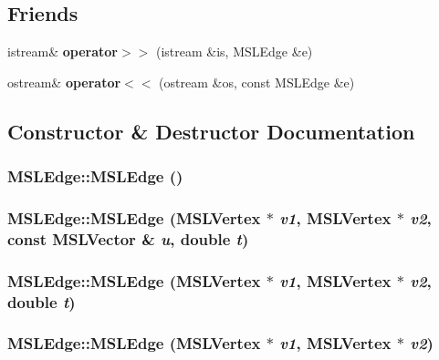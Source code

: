 \subsection*{Friends}
\begin{CompactItemize}
\item 
istream\& {\bf operator$>$$>$} (istream \&is, MSLEdge \&e)
\item 
ostream\& {\bf operator$<$$<$} (ostream \&os, const MSLEdge \&e)
\end{CompactItemize}


\subsection{Constructor \& Destructor Documentation}
\subsubsection{\setlength{\rightskip}{0pt plus 5cm}MSLEdge::MSLEdge ()}\label{class_MSLEdge_a0}


\subsubsection{\setlength{\rightskip}{0pt plus 5cm}MSLEdge::MSLEdge ({\bf MSLVertex} $\ast$ {\em v1}, {\bf MSLVertex} $\ast$ {\em v2}, const {\bf MSLVector} \& {\em u}, double {\em t})}\label{class_MSLEdge_a1}


\subsubsection{\setlength{\rightskip}{0pt plus 5cm}MSLEdge::MSLEdge ({\bf MSLVertex} $\ast$ {\em v1}, {\bf MSLVertex} $\ast$ {\em v2}, double {\em t})}\label{class_MSLEdge_a2}


\subsubsection{\setlength{\rightskip}{0pt plus 5cm}MSLEdge::MSLEdge ({\bf MSLVertex} $\ast$ {\em v1}, {\bf MSLVertex} $\ast$ {\em v2})}\label{class_MSLEdge_a3}


